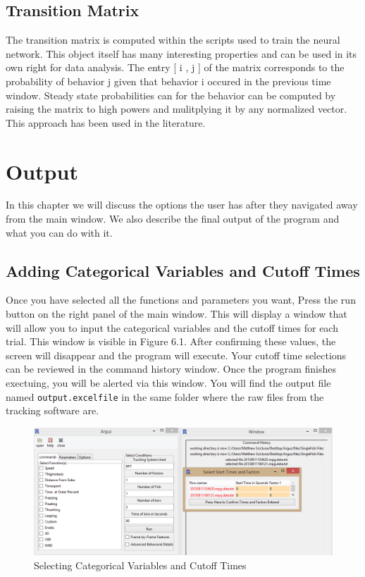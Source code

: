 \documentclass[12pt,titlepage]{report}
\begin{document}
\section{Transition Matrix}
The transition matrix is computed within the scripts used to train the neural network. This object itself has many interesting properties and can be used in its own right for data analysis. The entry [ i , j ] of the matrix corresponds to the probability of behavior j given that behavior i occured in the previous time window. Steady state probabilities can for the behavior can be computed by raising the matrix to high powers and mulitplying it by any normalized vector. This approach has been used in the literature.

\chapter{Output}

In this chapter we will discuss the options the user has after they navigated away from the main window. We also describe the final output of the program and what you can do with it.

\section{Adding Categorical Variables and Cutoff Times} Once you have selected all the functions and parameters you want, Press the run button on the right panel of the main window. This will display a window that will allow you to input the categorical variables and the cutoff times for each trial. This window is visible in Figure 6.1. After confirming these values, the screen will disappear and the program will execute. Your cutoff time selections can be reviewed in the command history window. Once the program finishes exectuing, you will be alerted via this window. You will find the output file named \texttt{output.excelfile} in the same folder where the raw files from the tracking software are.
\begin{figure}[ht!]
\centering
\includegraphics[width=120mm]{image18.png}
\caption{Selecting Categorical Variables and Cutoff Times}
\end{figure}
\end{document}

